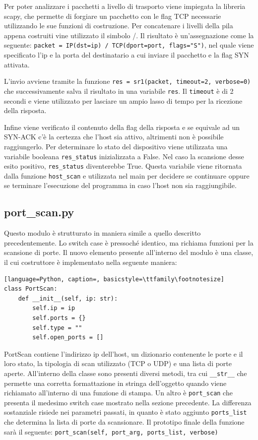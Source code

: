 \documentclass[12pt]{report}
\begin{document}
Per poter analizzare i pacchetti a livello di trasporto viene impiegata la libreria scapy, che permette di forgiare un pacchetto con le flag TCP necessarie utilizzando le sue funzioni di costruzione. Per concatenare i livelli della pila appena costruiti vine utilizzato il simbolo /. Il risultato è un'assegnazione come la seguente: \lstinline{packet = IP(dst=ip) / TCP(dport=port, flags="S")}, nel quale viene specificato l'ip e la porta del destinatario a cui inviare il pacchetto e la flag SYN attivata.

L'invio avviene tramite la funzione \lstinline{res = sr1(packet, timeout=2, verbose=0)} che successivamente salva il risultato in una variabile \lstinline{res}. Il \lstinline{timeout} è di 2 secondi e viene utilizzato per lasciare un ampio lasso di tempo per la ricezione della risposta.

Infine viene verificato il contenuto della flag della risposta e se equivale ad un SYN-ACK c'è la certezza che l'host sia attivo, altrimenti non è possibile raggiungerlo. Per determinare lo stato del dispositivo viene utilizzata una variabile booleana \lstinline{res_status} inizializzata a False. Nel caso la scansione desse esito positivo, \lstinline{res_status} diventerebbe True. Questa variabile viene ritornata dalla funzione \lstinline{host_scan} e utilizzata nel main per decidere se continuare oppure se terminare l'esecuzione del programma in caso l'host non sia raggiungibile.

\subsection{port\_scan.py}

Questo modulo è strutturato in maniera simile a quello descritto precedentemente. Lo switch case è pressoché identico, ma richiama funzioni per la scansione di porte. Il nuovo elemento presente all'interno del modulo è una classe, il cui costruttore è implementato nella seguente maniera:

\begin{lstlisting}[language=Python, caption=, basicstyle=\ttfamily\footnotesize]
class PortScan:
    def __init__(self, ip: str):
        self.ip = ip
        self.ports = {}
        self.type = ""
        self.open_ports = []
\end{lstlisting}

PortScan contiene l'indirizzo ip dell'host, un dizionario contenente le porte e il loro stato, la tipologia di scan utilizzato (TCP o UDP) e una lista di porte aperte. All'interno della classe sono presenti diversi metodi, tra cui \lstinline{__str__} che permette una corretta formattazione in stringa dell'oggetto quando viene richiamato all'interno di una funzione di stampa. Un altro è \lstinline{port_scan} che presenta il medesimo switch case mostrato nella sezione precedente. La differenza sostanziale risiede nei parametri passati, in quanto è stato aggiunto \lstinline{ports_list} che determina la lista di porte da scansionare. Il prototipo finale della funzione sarà il seguente: \lstinline{port_scan(self, port_arg, ports_list, verbose)}
\end{document}
